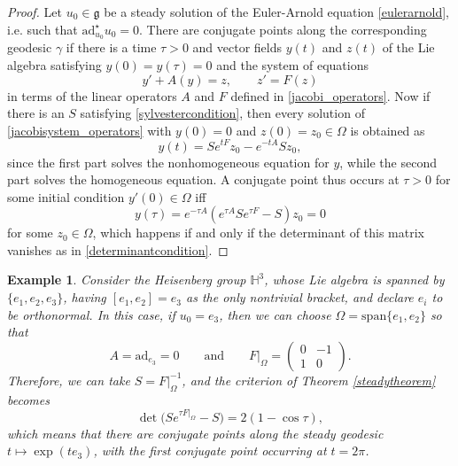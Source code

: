 \documentclass[oneside, 11pt]{amsart}
\newtheorem{example}[theorem]{Example}
\numberwithin{equation}{section}
\newcommand{\ad}{\mathrm{ad}}
\newcommand{\adstar}{\ad^{\star}}
\newcommand{\subby}{\Omega}
\newcommand{\Syl}{S}
\newcommand{\eulerop}{F}
\newcommand{\adop}{A}
\newcommand{\heis}{e}
\begin{document}
\begin{proof}
Let $u_0\in\mathfrak{g}$ be a steady solution of the Euler-Arnold equation \eqref{eulerarnold}, i.e. such that $\adstar_{u_0}u_0=0$. There are conjugate points along the corresponding geodesic $\gamma$ if there is a time $\tau>0$ and vector fields $y(t)$ and $z(t)$ of the Lie algebra satisfying $y(0) = y(\tau) = 0$ and the system of equations
\begin{equation}\label{jacobisystem_operators}
y'+\adop(y)=z,\qquad z'=\eulerop(z)
\end{equation}
in terms of the linear operators $\adop$ and $\eulerop$ defined in \eqref{jacobi_operators}. 
Now if there is an $\Syl$ satisfying \eqref{sylvestercondition}, then every solution of \eqref{jacobisystem_operators} with $y(0)=0$ and $z(0)=z_0\in \subby$ is obtained as
\begin{equation*}\label{steady_jacobi}
y(t)=\Syl e^{t\eulerop}z_0- e^{-t\adop}\Syl z_0,
\end{equation*} 
since the first part solves the nonhomogeneous equation for $y$, while the second part solves the homogeneous equation. A conjugate point thus occurs at $\tau>0$ for some initial condition $y'(0)\in \subby$ iff $$y(\tau) = e^{-\tau \adop} (e^{\tau \adop}\Syl e^{\tau \eulerop}-\Syl )z_0=0$$
for some $z_0\in \subby$, 
which happens if and only if the determinant of this matrix vanishes as in \eqref{determinantcondition}. 
\end{proof}
 


\begin{example}\label{heisenberg-example}
Consider the Heisenberg group $\mathbb{H}^3$, whose Lie algebra is spanned by $\{\heis_1, \heis_2, \heis_3\}$, having $[\heis_1, \heis_2] = \heis_3$ as the only nontrivial bracket, and declare $\heis_i$ to be orthonormal. In this case, if $u_0 = \heis_3$, then we can choose $\subby = \mathrm{span}\{\heis_1,\heis_2\}$ so that  
\begin{equation*}
\adop = \mathrm{ad}_{\heis_3} = 0 \qquad \text{and} \qquad \eulerop\vert_{\subby} = \left(
\begin{matrix}
0 & -1 \\
1 & 0
\end{matrix}
\right).
\end{equation*}
Therefore, we can take $\Syl = \eulerop\vert_{\Omega}^{-1}$, and the criterion of Theorem \ref{steadytheorem} becomes
\begin{equation*}
\det\big(\Syl e^{\tau \eulerop\vert_{\Omega}}-\Syl\big) = 2(1-\cos{\tau}), 
\end{equation*}
which means that there are conjugate points along the steady geodesic $t \mapsto \exp(t\heis_3)$,  
with the first conjugate point occurring at $t = 2\pi$. 
\end{example}
\end{document}
